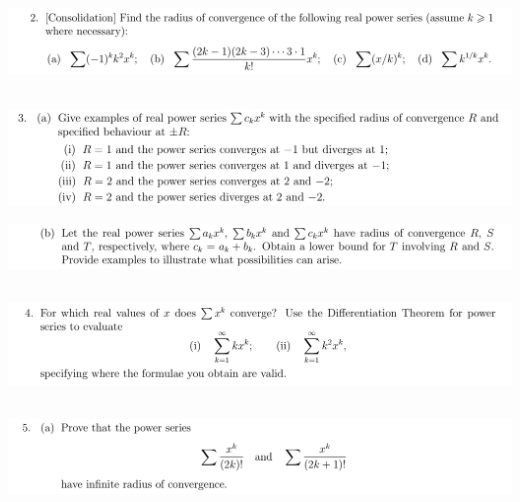 \documentclass[12pt]{article}
\begin{document}
\newpage
\subsection{}
\begin{mdframed}
\includegraphics[width=400pt]{img/analysis--oxford-M2-I-7-2.png}
\end{mdframed}

\newpage
\subsection{}
\begin{mdframed}
\includegraphics[width=400pt]{img/analysis--oxford-M2-I-7-3-a.png}
\end{mdframed}

\begin{mdframed}
\includegraphics[width=400pt]{img/analysis--oxford-M2-I-7-3-b.png}
\end{mdframed}

\newpage
\subsection{}
\begin{mdframed}
\includegraphics[width=400pt]{img/analysis--oxford-M2-I-7-4.png}
\end{mdframed}

\newpage
\subsection{}
\begin{mdframed}
\includegraphics[width=400pt]{img/analysis--oxford-M2-I-7-5.png}
\end{mdframed}
\end{document}
